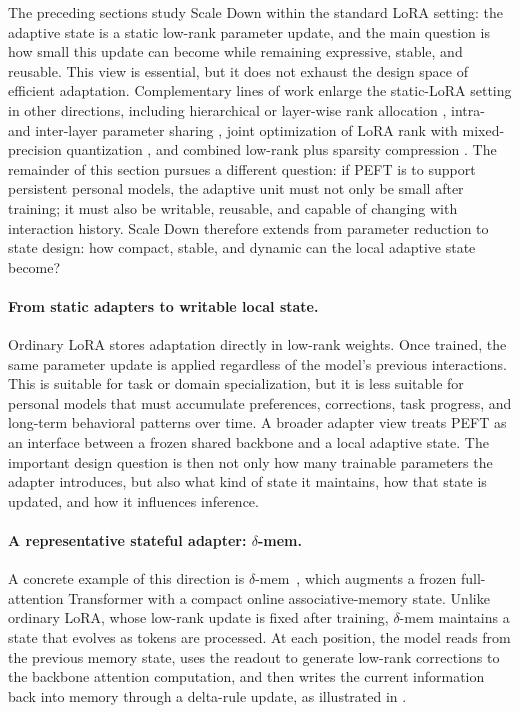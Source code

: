 \documentclass{llmxive}
\begin{document}
The preceding sections study Scale Down within the standard LoRA setting: the adaptive state is a static low-rank parameter update, and the main question is how small this update can become while remaining expressive, stable, and reusable. This view is essential, but it does not exhaust the design space of efficient adaptation. Complementary lines of work enlarge the static-LoRA setting in other directions, including hierarchical or layer-wise rank allocation \citep{zhou2025rankadaptor,zhou2026lara}, intra- and inter-layer parameter sharing \citep{zhou2025bslora}, joint optimization of LoRA rank with mixed-precision quantization \citep{zhou2025balancing,zhou2026autoqra}, and combined low-rank plus sparsity compression \citep{zhou2025largecompression}. The remainder of this section pursues a different question: if PEFT is to support persistent personal models, the adaptive unit must not only be small after training; it must also be writable, reusable, and capable of changing with interaction history. Scale Down therefore extends from parameter reduction to state design: how compact, stable, and dynamic can the local adaptive state become?

\paragraph{From static adapters to writable local state.}
Ordinary LoRA stores adaptation directly in low-rank weights. Once trained, the same parameter update is applied regardless of the model's previous interactions. This is suitable for task or domain specialization, but it is less suitable for personal models that must accumulate preferences, corrections, task progress, and long-term behavioral patterns over time. A broader adapter view treats PEFT as an interface between a frozen shared backbone and a local adaptive state. The important design question is then not only how many trainable parameters the adapter introduces, but also what kind of state it maintains, how that state is updated, and how it influences inference.

\paragraph{A representative stateful adapter: \texorpdfstring{$\delta$}{...}-mem.}
A concrete example of this direction is $\delta$-mem~\citep{lei2026deltamem}, which augments a frozen full-attention Transformer with a compact online associative-memory state. Unlike ordinary LoRA, whose low-rank update is fixed after training, $\delta$-mem maintains a state that evolves as tokens are processed. At each position, the model reads from the previous memory state, uses the readout to generate low-rank corrections to the backbone attention computation, and then writes the current information back into memory through a delta-rule update, as illustrated in .
\end{document}
